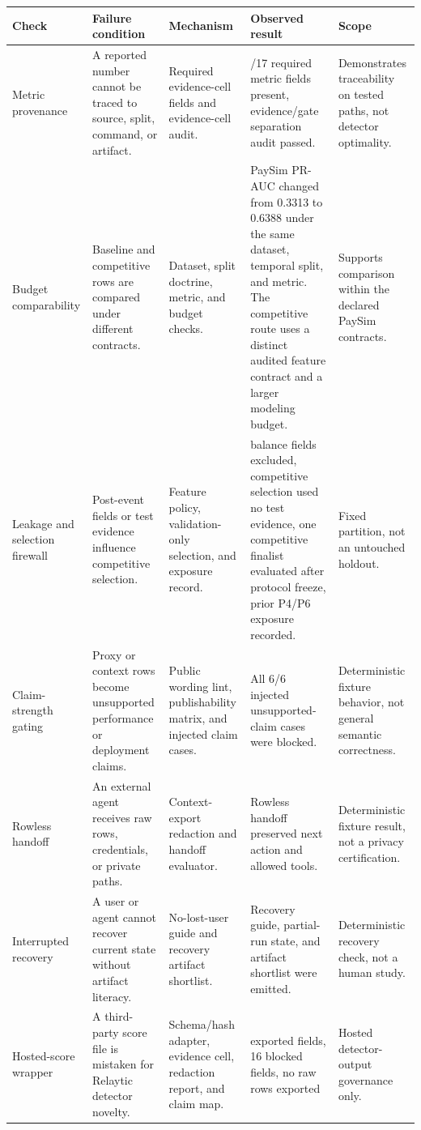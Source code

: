 \documentclass[11pt]{article}
\begin{document}
\begin{center}
\begin{minipage}{\linewidth}
\scriptsize
\setlength{\tabcolsep}{3pt}
\renewcommand{\arraystretch}{1.16}
\begin{tabularx}{\linewidth}{@{}>{\raggedright\arraybackslash}X >{\raggedright\arraybackslash}X >{\raggedright\arraybackslash}X >{\raggedright\arraybackslash}X >{\raggedright\arraybackslash}X@{}}
\toprule
Check & Failure condition & Mechanism & Observed result & Scope \\
\midrule
Metric provenance & A reported number cannot be traced to source, split, command, or artifact. & Required evidence-cell fields and evidence-cell audit. & 17/17 required metric fields present, evidence/gate separation audit passed. & Demonstrates traceability on tested paths, not detector optimality. \\
Budget comparability & Baseline and competitive rows are compared under different contracts. & Dataset, split doctrine, metric, and budget checks. & PaySim PR-AUC changed from 0.3313 to 0.6388 under the same dataset, temporal split, and metric. The competitive route uses a distinct audited feature contract and a larger modeling budget. & Supports comparison within the declared PaySim contracts. \\
Leakage and selection firewall & Post-event fields or test evidence influence competitive selection. & Feature policy, validation-only selection, and exposure record. & 4 balance fields excluded, competitive selection used no test evidence, one competitive finalist evaluated after protocol freeze, prior P4/P6 exposure recorded. & Fixed partition, not an untouched holdout. \\
Claim-strength gating & Proxy or context rows become unsupported performance or deployment claims. & Public wording lint, publishability matrix, and injected claim cases. & All 6/6 injected unsupported-claim cases were blocked. & Deterministic fixture behavior, not general semantic correctness. \\
Rowless handoff & An external agent receives raw rows, credentials, or private paths. & Context-export redaction and handoff evaluator. & Rowless handoff preserved next action and allowed tools. & Deterministic fixture result, not a privacy certification. \\
Interrupted recovery & A user or agent cannot recover current state without artifact literacy. & No-lost-user guide and recovery artifact shortlist. & Recovery guide, partial-run state, and artifact shortlist were emitted. & Deterministic recovery check, not a human study. \\
Hosted-score wrapper & A third-party score file is mistaken for Relaytic detector novelty. & Schema/hash adapter, evidence cell, redaction report, and claim map. & 11 exported fields, 16 blocked fields, no raw rows exported & Hosted detector-output governance only. \\
\bottomrule
\end{tabularx}
\end{minipage}
\end{center}
\end{document}
